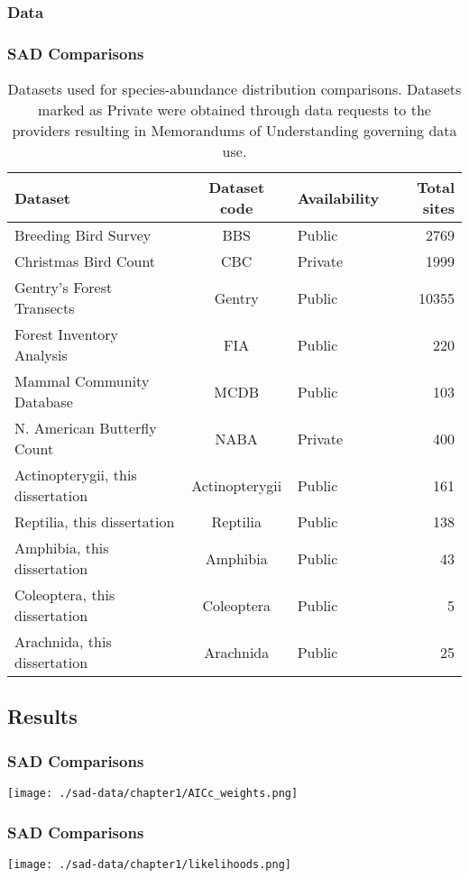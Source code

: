 \documentclass[14pt]{beamer}
\begin{document}
\subsubsection{Data}
\begin{frame}[shrink=35]
\frametitle{SAD Comparisons}
\begin{center}
\begin{table}
\begin{tabular}{l|c|l|r}
 Dataset &Dataset code &Availability &Total sites\\
\hline
 Breeding Bird Survey &BBS &Public &2769\\
 Christmas Bird Count &CBC &Private &1999\\
 Gentry's Forest Transects &Gentry &Public &10355\\
 Forest Inventory Analysis &FIA	 &Public &220\\
 Mammal Community Database &MCDB &Public &103\\
 N. American Butterfly Count &NABA &Private &400\\
 Actinopterygii, this dissertation	 &Actinopterygii &Public &161\\
 Reptilia, this dissertation &Reptilia &Public &138\\
 Amphibia, this dissertation &Amphibia &Public &43\\
 Coleoptera, this dissertation &Coleoptera &Public &5\\
 Arachnida, this dissertation &Arachnida &Public &25\\
\end{tabular}
\caption{Datasets used for species-abundance distribution comparisons. Datasets marked as Private were obtained through data requests to the providers resulting in Memorandums of Understanding governing data use.}
\end{table}
\end{center}
\end{frame}

\subsection{Results}
\begin{frame}{}
\frametitle{SAD Comparisons}
\texttt{[image: ./sad-data/chapter1/AICc\_weights.png]}
\end{frame}

\begin{frame}{}
\frametitle{SAD Comparisons}
\texttt{[image: ./sad-data/chapter1/likelihoods.png]}
\end{frame}
\end{document}
